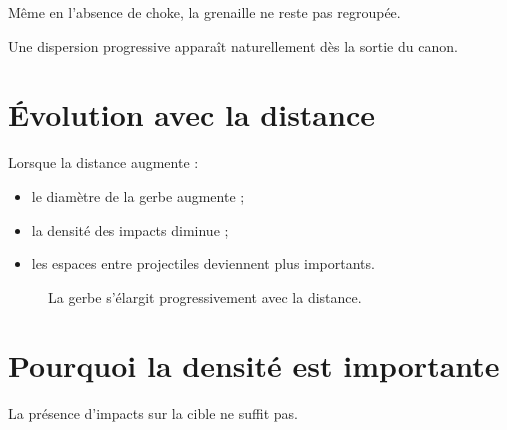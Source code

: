 Même en l'absence de choke, la grenaille ne reste pas regroupée.

Une dispersion progressive apparaît naturellement dès la sortie du canon.

\section{Évolution avec la distance}

Lorsque la distance augmente :

\begin{itemize}
    \item le diamètre de la gerbe augmente ;
    \item la densité des impacts diminue ;
    \item les espaces entre projectiles deviennent plus importants.
\end{itemize}

\begin{figure}[htbp]
\centering


\caption{La gerbe s'élargit progressivement avec la distance.}
\label{fig:evolution_gerbe_distance}

\end{figure}

\section{Pourquoi la densité est importante}

La présence d'impacts sur la cible ne suffit pas.

